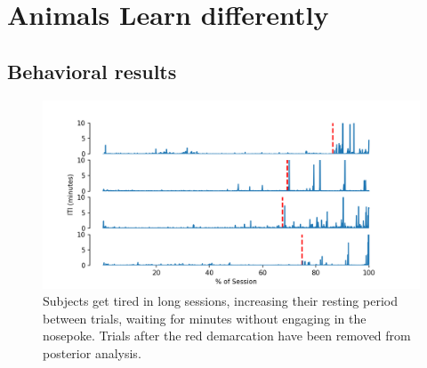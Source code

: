 \chapter{Animals Learn differently}
\label{chap:learning}


\section{Behavioral results}
\begin{figure}
    \centering
    \includegraphics[width=\textwidth]{figures/iti.png}
    \caption[Subjects get tired in long sessions]{Subjects get tired in long sessions, increasing their resting period between trials, waiting for minutes without engaging in the nosepoke. Trials after the red demarcation have been removed from posterior analysis.}
    \label{fig:iti}
\end{figure} %

